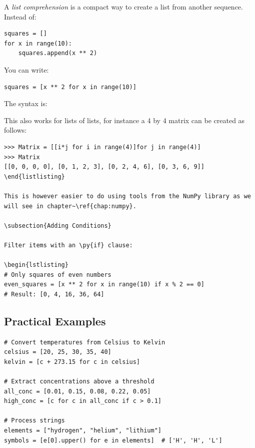 A \emph{list comprehension} is a compact way to create a list from another sequence. Instead of:

\begin{lstlisting}
squares = []
for x in range(10):
    squares.append(x ** 2)
\end{lstlisting}

You can write:

\begin{lstlisting}
squares = [x ** 2 for x in range(10)]
\end{lstlisting}

The syntax is: 

This also works for lists of lists, for instance a 4 by 4 matrix can be created as follows:

\begin{lstlisting}[style=outputstyle]
>>> Matrix = [[i*j for i in range(4)]for j in range(4)]
>>> Matrix
[[0, 0, 0, 0], [0, 1, 2, 3], [0, 2, 4, 6], [0, 3, 6, 9]]
\end{listlisting}

This is however easier to do using tools from the NumPy library as we will see in chapter~\ref{chap:numpy}.

\subsection{Adding Conditions}

Filter items with an \py{if} clause:

\begin{lstlisting}
# Only squares of even numbers
even_squares = [x ** 2 for x in range(10) if x % 2 == 0]
# Result: [0, 4, 16, 36, 64]
\end{lstlisting}

\subsection{Practical Examples}

\begin{lstlisting}
# Convert temperatures from Celsius to Kelvin
celsius = [20, 25, 30, 35, 40]
kelvin = [c + 273.15 for c in celsius]

# Extract concentrations above a threshold
all_conc = [0.01, 0.15, 0.08, 0.22, 0.05]
high_conc = [c for c in all_conc if c > 0.1]

# Process strings
elements = ["hydrogen", "helium", "lithium"]
symbols = [e[0].upper() for e in elements]  # ['H', 'H', 'L']
\end{lstlisting}

